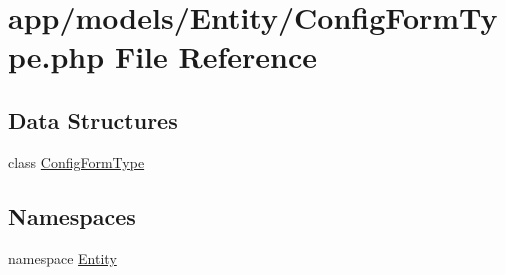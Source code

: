 \hypertarget{_config_form_type_8php}{\section{app/models/\-Entity/\-Config\-Form\-Type.php File Reference}
\label{_config_form_type_8php}
}
\subsection*{Data Structures}
\begin{DoxyCompactItemize}
\item 
class \hyperlink{class_entity_1_1_config_form_type}{Config\-Form\-Type}
\end{DoxyCompactItemize}
\subsection*{Namespaces}
\begin{DoxyCompactItemize}
\item 
namespace \hyperlink{namespace_entity}{Entity}
\end{DoxyCompactItemize}
